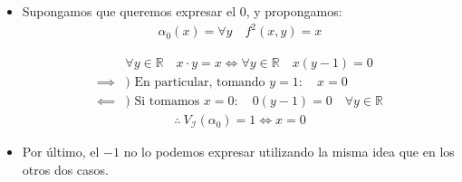 \begin{itemize}
\begin{itemize}
            Interpretando $\alpha_1$:
            \begin{align*}
                & \forall y \in \mathbb{R} \quad x \cdot y = y 
                \iff \forall y \in \mathbb{R} \quad (x-1) y = 0 \\
                \implies) & \notamath{En particular para $y = 3$}
                3 (x-1) = 0 \\
                &\implies x = 1 \\
                \impliedby) & \notamath{x = 1}
                (1-1) y = 0 \quad \forall y \in \mathbb{R} \\
            \end{align*}
            \begin{gather*}
                \therefore ~ V_{\mathcal{I}, v_{x=1}}(\alpha_1(x)) = 1 \iff x = 1
            \end{gather*}

            Entonces la fórmula $\alpha_1(x)$ expresa $B = \{ 1 \}$. Es decir,
            $B$ es expresable en $\mathcal{I}$.


            No es lo que me pedían en este ejercicio, pero nos damos cuenta que 
            al 1 lo podemos describir de esta forma.


            \item Supongamos que queremos expresar el 0, y propongamos:
            \begin{gather*}
                \alpha_0(x) = \forall y \quad f^2(x,y) = x
            \end{gather*}

            \begin{align*}
                & \forall y \in \mathbb{R} \quad x \cdot y = x \iff \forall y \in
                \mathbb{R} \quad x(y-1) = 0 \\
                \implies & ) \text{ En particular, tomando } y = 1: \quad x = 0 \\
                \impliedby & ) \text{ Si tomamos } x = 0: \quad 0(y-1) = 0 \quad
                \forall y \in \mathbb{R}
            \end{align*}
            \begin{gather*}
                \therefore ~ V_{\mathcal{I}}(\alpha_0) = 1 \iff x = 0
            \end{gather*}


            \item Por último, el $-1$ no lo podemos expresar utilizando la misma 
            idea que en los otros dos casos.


\end{itemize}
\end{itemize}
